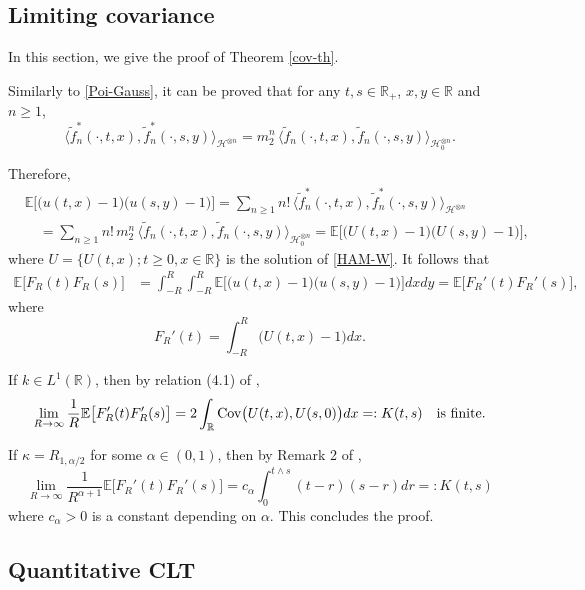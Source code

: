 \documentclass[12pt]{article}
\def\cH{\mathcal{H}}
\def\bE{\mathbb{E}}
\def\bR{\mathbb{R}}
\def\k{\kappa}
\begin{document}
\subsection{Limiting covariance}

In this section, we give the proof of Theorem \ref{cov-th}. 

\medskip

Similarly to \eqref{Poi-Gauss}, it can be proved that for any $t,s\in \bR_{+}$, $x,y \in \bR$ and $n\geq 1$,
\[ \langle \widetilde{f}_n^*(\cdot,t,x),\widetilde{f}_n^*(\cdot,s,y)\rangle_{\cH^{\otimes n}}= m_2^n \, \langle \widetilde{f}_n(\cdot,t,x),\widetilde{f}_n(\cdot,s,y)\rangle_{\cH_0^{\otimes n}}.
\]

Therefore,
\begin{align*}
& \bE\big[\big(u(t,x)-1\big)\big(u(s,y)-1\big)\big]=\sum_{n\geq 1}n!\,\langle \widetilde{f}_n^*(\cdot,t,x),\widetilde{f}_n^*(\cdot,s,y)\rangle_{\cH^{\otimes n}}\\
& \quad = \sum_{n\geq 1}n!\, m_2^n \, \langle \widetilde{f}_n(\cdot,t,x),\widetilde{f}_n(\cdot,s,y)\rangle_{\cH_0^{\otimes n}}=\bE\big[\big(U(t,x)-1\big)\big(U(s,y)-1\big)\big],
\end{align*}
where $U=\{U(t,x);t\geq 0,x\in \bR\}$ is the solution of \eqref{HAM-W}.
It follows that
\begin{align*}
\bE\big[ F_R(t) F_R(s)\big] & =\int_{-R}^R \int_{-R}^R \bE\big[\big(u(t,x)-1\big)\big(u(s,y)-1\big)\big] dxdy =
\bE\big[ F_R'(t) F_R'(s)\big],
\end{align*}
where 
\[
F_R'(t)=\int_{-R}^R \big(U(t,x)-1\big)dx.
\]

If $k\in L^1(\bR)$, then by relation (4.1) of \cite{NZ22}, 
\[
\lim_{R\to \infty} \frac{1}{R}\bE\big[ F_R'(t) F_R'(s)\big] =2\int_{\bR} {\rm Cov}\big(U(t,x),U(s,0)\big)dx=:K(t,s) \quad \mbox{is finite}.
\]

If $\k=R_{1,\alpha/2}$ for some $\alpha \in (0,1)$, then by Remark 2 of \cite{DNZ20},
\[
\lim_{R \to \infty}\frac{1}{R^{\alpha+1}}\bE\big[ F_R'(t) F_R'(s)\big]=c_{\alpha} \int_0^{t\wedge s}
(t-r)(s-r)dr=:K(t,s)
\]
where $c_{\alpha}>0$ is a constant depending on $\alpha$. This concludes the proof.

\subsection{Quantitative CLT}
\end{document}
